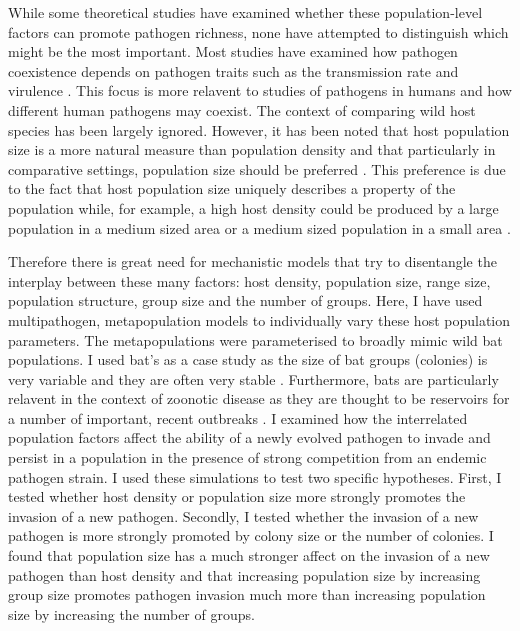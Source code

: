 While some theoretical studies have examined whether these population-level factors can promote pathogen richness, none have attempted to distinguish which might be the most important.
Most studies have examined how pathogen coexistence depends on pathogen traits such as the transmission rate and virulence \cite{allen2004sis, may1994superinfection, alizon2008decreased}.
This focus is more relavent to studies of pathogens in humans and how different human pathogens may coexist.
The context of comparing wild host species has been largely ignored.
However, it has been noted that host population size is a more natural measure than population density and that particularly in comparative settings, population size should be preferred \cite{begon2002clarification}.
This preference is due to the fact that host population size uniquely describes a property of the population while, for example, a high host density could be produced by a large population in a medium sized area or a medium sized population in a small area \cite{begon2002clarification}.





Therefore there is great need for mechanistic models that try to disentangle the interplay between these many factors: host density, population size, range size, population structure, group size and the number of groups.
Here, I have used multipathogen, metapopulation models to individually vary these host population parameters.
The metapopulations were parameterised to broadly mimic wild bat populations.
I used bat's as a case study as the size of bat groups (colonies) is very variable and they are often very stable \cite{kerth2011bats, mccracken1981social}.
Furthermore, bats are particularly relavent in the context of zoonotic disease as they are thought to be reservoirs for a number of important, recent outbreaks \cite{calisher2006bats, li2005bats}.
I examined how the interrelated population factors affect the ability of a newly evolved pathogen to invade and persist in a population in the presence of strong competition from an endemic pathogen strain.
I used these simulations to test two specific hypotheses.
First, I tested whether host density or population size more strongly promotes the invasion of a new pathogen.
Secondly, I tested whether the invasion of a new pathogen is more strongly promoted by colony size or the number of colonies.
I found that population size has a much stronger affect on the invasion of a new pathogen than host density and that increasing population size by increasing group size promotes pathogen invasion much more than increasing population size by increasing the number of groups.




